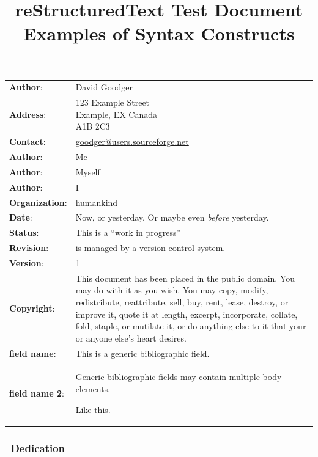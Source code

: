 \documentclass[10pt,a4paper,english]{article}
\title{reStructuredText Test Document\\
\large{Examples of Syntax Constructs}
}
\author{}
\date{}
\newlength{\docinfowidth}
\newlength{\locallinewidth}
\begin{document}
\maketitle

\begin{center}
\begin{tabularx}{\docinfowidth}{lX}
\textbf{Author}: &
	David Goodger \\
\textbf{Address}: &
	{\raggedright
123 Example Street~\\
Example, EX  Canada~\\
A1B 2C3 } \\
\textbf{Contact}: &
	\href{mailto:goodger@users.sourceforge.net}{goodger@users.sourceforge.net} \\
\textbf{Author}: &
	Me \\
\textbf{Author}: &
	Myself \\
\textbf{Author}: &
	I \\
\textbf{Organization}: &
	humankind \\
\textbf{Date}: &
	Now, or yesterday.  Or maybe even \emph{before} yesterday. \\
\textbf{Status}: &
	This is a ``work in progress'' \\
\textbf{Revision}: &
	is managed by a version control system. \\
\textbf{Version}: &
	1 \\
\textbf{Copyright}: &
	This document has been placed in the public domain. You
may do with it as you wish. You may copy, modify,
redistribute, reattribute, sell, buy, rent, lease,
destroy, or improve it, quote it at length, excerpt,
incorporate, collate, fold, staple, or mutilate it, or do
anything else to it that your or anyone else's heart
desires. \\
\textbf{field name}: &
	This is a generic bibliographic field. \\
\textbf{field name 2}: &
	Generic bibliographic fields may contain multiple body elements.

Like this. \\
\end{tabularx}
\end{center}

\setlength{\locallinewidth}{\linewidth}


\subsubsection*{~\hfill Dedication\hfill ~}
\end{document}
